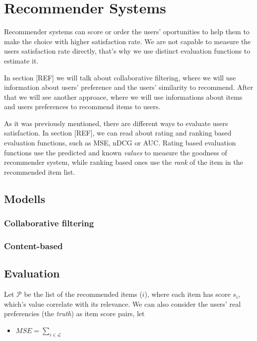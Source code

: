 \chapter{Recommender Systems}
Recommender systems can score or order the users' oportunities to help them to
make the choice with higher satisfaction rate. We are not capable to measure
the users satisfaction rate directly, that's why we use distinct evaluation functions
to estimate it.

In section [REF] we will talk about collaborative filtering, where we will use
information about users' preference and the users' similarity to recommend. After that
we will see another approace, where we will use informations about items and users
preferences to recommend items to users.

As it was previously mentioned, there are different ways to evaluate users satisfaction.
In section [REF], we can read about rating and ranking based evaluation functions, such
as MSE, nDCG or AUC. Rating based evaluation functions use the predicted and known
\emph{values} to measure the goodness of recommender system, while ranking based ones use
the \emph{rank} of the item in the recommended item list.



\section{Modells}
\subsection{Collaborative filtering}
\subsection{Content-based}

\section{Evaluation}
Let $\mathcal{P}$ be the list of the recommended items ($i$), where each item has
score $s_i$, which's value correlate with its relevance. We can also consider the
users' real preferencies (the \emph{truth}) as item score pairs, let


\begin{itemize}
\item $MSE=\sum_{i\in\mathcal{L}}$
  
\end{itemize}
